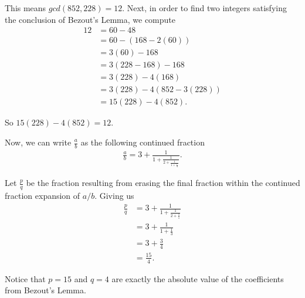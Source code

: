 \documentclass[12pt]{article}
\begin{document}
This means $gcd(852, 228) = 12$.
Next, in order to find two integers satisfying the conclusion of Bezout’s Lemma, we compute
\begin{align*}
    12 & = 60 - 48                  \\
       & = 60 - (168 - 2 (60))      \\
       & = 3 (60) - 168             \\
       & =  3 (228 - 168) - 168     \\
       & = 3(228) - 4(168)          \\
       & = 3(228) - 4(852 - 3(228)) \\
       & = 15(228) - 4(852).
\end{align*}

So $15(228) - 4(852) = 12$.

Now, we can write $\frac{a}{b}$ as the following continued fraction
\begin{align*}
    \frac{a}{b} = 3 + \frac{1}{1 + \frac{1}{2 + \frac{1}{1+\frac{1}{4}}}}.
\end{align*}

Let $\frac{p}{q}$ be the fraction resulting from erasing the final fraction within the continued fraction expansion of $a/b$. Giving us
\begin{align*}
    \frac{p}{q} & = 3 + \frac{1}{1 + \frac{1}{2 + \frac{1}{1}}} \\
                & = 3 + \frac{1}{1 + \frac{1}{3}}               \\
                & = 3 + \frac{3}{4}                             \\
                & = \frac{15}{4}.
\end{align*}

Notice that $p=15$ and $q=4$ are exactly the absolute value of the coefficients from Bezout's Lemma.
\end{document}
